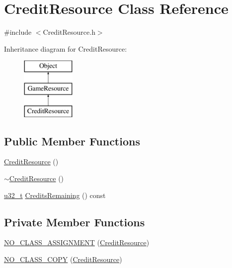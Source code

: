 \section{Credit\-Resource Class Reference}
\label{class_credit_resource}


{\ttfamily \#include $<$Credit\-Resource.\-h$>$}

Inheritance diagram for Credit\-Resource\-:\begin{figure}[H]
\begin{center}
\leavevmode
\includegraphics[height=3.000000cm]{class_credit_resource}
\end{center}
\end{figure}
\subsection*{Public Member Functions}
\begin{DoxyCompactItemize}
\item 
\hyperlink{class_credit_resource_a4467574af8ac6b9b48549d1abfa257ca}{Credit\-Resource} ()
\item 
\hyperlink{class_credit_resource_aaf2172c57cc0546480b49cfea705060b}{$\sim$\-Credit\-Resource} ()
\item 
\hyperlink{types_8h_a0c0a490ab7fa397be6c764a935cc5ea4}{u32\-\_\-t} \hyperlink{class_credit_resource_aad0940a97b0db1f4850ba96f44c8fda9}{Credits\-Remaining} () const 
\end{DoxyCompactItemize}
\subsection*{Private Member Functions}
\begin{DoxyCompactItemize}
\item 
\hyperlink{class_credit_resource_ae8316ac457e86f91cf40d4935e17b681}{N\-O\-\_\-\-C\-L\-A\-S\-S\-\_\-\-A\-S\-S\-I\-G\-N\-M\-E\-N\-T} (\hyperlink{class_credit_resource}{Credit\-Resource})
\item 
\hyperlink{class_credit_resource_a6f481f4f5d00bf84cb65a47e20adef86}{N\-O\-\_\-\-C\-L\-A\-S\-S\-\_\-\-C\-O\-P\-Y} (\hyperlink{class_credit_resource}{Credit\-Resource})
\end{DoxyCompactItemize}
